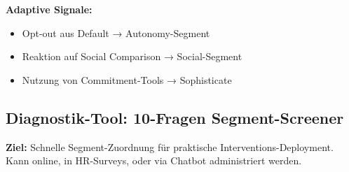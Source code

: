 \textbf{Adaptive Signale:}
\begin{itemize}
\item Opt-out aus Default → Autonomy-Segment
\item Reaktion auf Social Comparison → Social-Segment
\item Nutzung von Commitment-Tools → Sophisticate
\end{itemize}

\subsection{Diagnostik-Tool: 10-Fragen Segment-Screener}

\textbf{Ziel:} Schnelle Segment-Zuordnung für praktische Interventions-Deployment. Kann online, in HR-Surveys, oder via Chatbot administriert werden.

